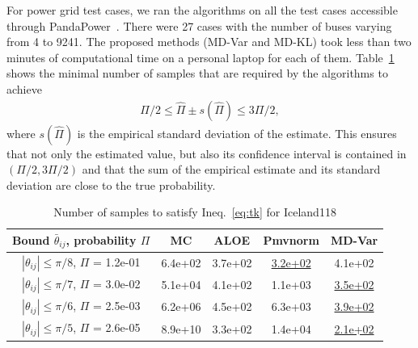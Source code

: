 For power grid test cases, we ran the algorithms on all the test cases accessible through PandaPower~\cite{pandapower.2018}. There were 27 cases with the number of buses varying from 4 to 9241. The proposed methods (MD-Var and MD-KL) took less than two minutes of computational time on a personal laptop for each of them. 
%
Table~\ref{tab:sample-compX} shows the minimal number of samples that are required by the algorithms to achieve \begin{align}    
\Pi/2 \le \hat\Pi \pm s(\hat\Pi) \le 3\Pi/2, \label{eq:tk}\end{align}
where $s(\hat\Pi)$ is the empirical standard deviation of the estimate. This ensures that not only the estimated value, but also its confidence interval is contained in $(\Pi/2, 3\Pi/2)$ and that the sum of the empirical estimate and its standard deviation are close to %
the true probability. 


\begin{table}[ht]
\centering
\caption{Number of samples to satisfy Ineq.~\eqref{eq:tk} 
 for Iceland118}
 \begin{tabular}{|c|c|c|c|c|} 
 \hspace{-2mm}Bound ${\bar\theta}_{ij}$, probability $\Pi$ & MC & ALOE & Pmvnorm & MD-Var\\
 \hline
  \hspace{-2mm}$|{\theta}_{ij}| \le \pi/8$, $\Pi$ = 1.2e-01 & 6.4e+02 & 3.7e+02 & \underline{3.2e+02} & 4.1e+02\\
  \hspace{-2mm}$|{\theta}_{ij}| \le \pi/7$, $\Pi$ = 3.0e-02 & 5.1e+04 & 4.1e+02 & 1.1e+03 & \underline{3.5e+02}\\
  \hspace{-2mm}$|{\theta}_{ij}| \le \pi/6$, $\Pi$ = 2.5e-03  & 6.2e+06 & 4.5e+02 & 6.3e+03 & \underline{3.9e+02} \\
  \hspace{-2mm}$|{\theta}_{ij}| \le \pi/5$, $\Pi$ = 2.6e-05  & 8.9e+10 & 3.3e+02 & 1.4e+04 & \underline{2.1e+02}\\
  \bottomrule
 \end{tabular}
 \vspace{-0mm}\label{tab:sample-compX}
\end{table}




